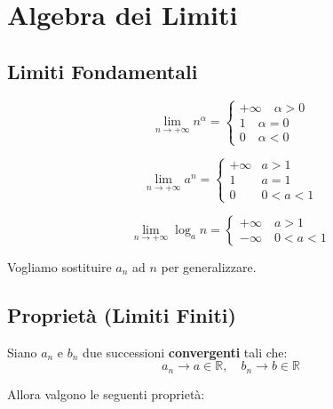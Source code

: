 
\pf{
    \[
    ||a_{n}|-|l||< |a_{n} -l |\to ||a_{n}||\leq|a_{n}|
    \]
}






\section{Algebra dei Limiti}\label{algebra-dei-limiti}

\subsection{Limiti Fondamentali}

\[
\lim_{n \to +\infty} n^{\alpha} = 
\begin{cases}
+\infty \quad \alpha>0\\ 
1 \quad \alpha=0\\ 
0 \quad \alpha<0
\end{cases}
\]

\[
\lim_{n \to +\infty} a^n = 
\begin{cases}
+\infty & a>1\\ 
1 & a=1\\ 
0 & 0<a<1
\end{cases}
\]

\[
\lim_{n \to +\infty} \log_a n = 
\begin{cases}
+\infty \quad a>1\\
-\infty \quad 0<a<1
\end{cases}
\]

Vogliamo sostituire \(a_n\) ad \(n\) per generalizzare.
\subsection{Proprietà (Limiti Finiti)}\label{proprieta-limiti-finiti}

Siano \(a_n\) e \(b_n\) due successioni \textbf{convergenti} tali che:  
\[a_n \to a \in \mathbb{R}, \quad b_n \to b \in \mathbb{R}\]

Allora valgono le seguenti proprietà:
